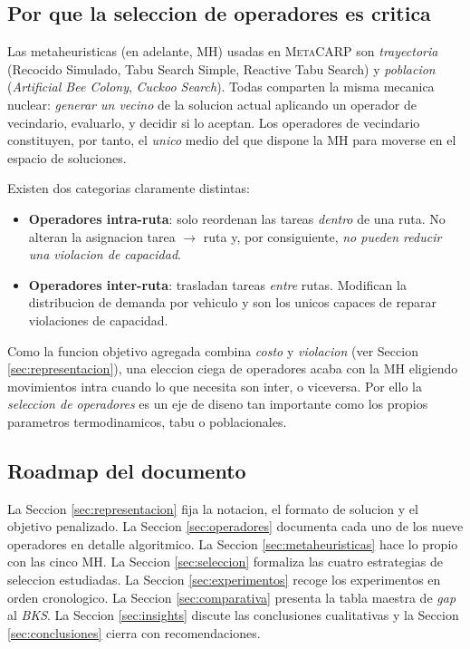 \documentclass[11pt,a4paper]{article}
\newcommand{\mh}{MH}
\begin{document}
\subsection{Por que la seleccion de operadores es critica}

Las metaheuristicas (en adelante, \mh) usadas en \textsc{MetaCARP}
son \emph{trayectoria} (Recocido Simulado, Tabu Search Simple,
Reactive Tabu Search) y \emph{poblacion} (\emph{Artificial Bee Colony},
\emph{Cuckoo Search}). Todas comparten la misma mecanica nuclear:
\emph{generar un vecino} de la solucion actual aplicando un operador
de vecindario, evaluarlo, y decidir si lo aceptan. Los operadores de
vecindario constituyen, por tanto, el \emph{unico} medio del que
dispone la \mh{} para moverse en el espacio de soluciones.

Existen dos categorias claramente distintas:
\begin{itemize}
\item \textbf{Operadores intra-ruta}: solo reordenan las tareas
\emph{dentro} de una ruta. No alteran la asignacion tarea $\to$ ruta
y, por consiguiente, \emph{no pueden reducir una violacion de
capacidad}.
\item \textbf{Operadores inter-ruta}: trasladan tareas \emph{entre}
rutas. Modifican la distribucion de demanda por vehiculo y son los
unicos capaces de reparar violaciones de capacidad.
\end{itemize}

Como la funcion objetivo agregada combina \emph{costo} y
\emph{violacion} (ver Seccion \ref{sec:representacion}), una eleccion
ciega de operadores acaba con la \mh{} eligiendo movimientos intra
cuando lo que necesita son inter, o viceversa. Por ello la
\emph{seleccion de operadores} es un eje de diseno tan importante como
los propios parametros termodinamicos, tabu o poblacionales.

\subsection{Roadmap del documento}

La Seccion \ref{sec:representacion} fija la notacion, el formato de
solucion y el objetivo penalizado. La Seccion \ref{sec:operadores}
documenta cada uno de los nueve operadores en detalle algoritmico. La
Seccion \ref{sec:metaheuristicas} hace lo propio con las cinco \mh{}.
La Seccion \ref{sec:seleccion} formaliza las cuatro estrategias de
seleccion estudiadas. La Seccion \ref{sec:experimentos} recoge los
experimentos en orden cronologico. La Seccion \ref{sec:comparativa}
presenta la tabla maestra de \emph{gap} al \emph{BKS}. La
Seccion \ref{sec:insights} discute las conclusiones cualitativas y la
Seccion \ref{sec:conclusiones} cierra con recomendaciones.
\end{document}
